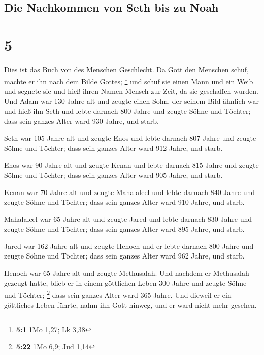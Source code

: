\hypertarget{die-nachkommen-von-seth-bis-zu-noah}{%
\subsection{Die Nachkommen von Seth bis zu
Noah}\label{die-nachkommen-von-seth-bis-zu-noah}}

\hypertarget{section-4}{%
\section{5}\label{section-4}}

 Dies ist das Buch von des Menschen Geschlecht. Da Gott
den Menschen schuf, machte er ihn nach dem Bilde Gottes; \footnote{\textbf{5:1}
  1Mo 1,27; Lk 3,38}  und schuf sie einen Mann und ein
Weib und segnete sie und hieß ihren Namen Mensch zur Zeit, da sie
geschaffen wurden.  Und Adam war 130 Jahre alt und zeugte
einen Sohn, der seinem Bild ähnlich war und hieß ihn Seth 
und lebte darnach 800 Jahre und zeugte Söhne und Töchter; 
dass sein ganzes Alter ward 930 Jahre, und starb.

 Seth war 105 Jahre alt und zeugte Enos  und
lebte darnach 807 Jahre und zeugte Söhne und Töchter; 
dass sein ganzes Alter ward 912 Jahre, und starb.

 Enos war 90 Jahre alt und zeugte Kenan 
und lebte darnach 815 Jahre und zeugte Söhne und Töchter;
 dass sein ganzes Alter ward 905 Jahre, und starb.

 Kenan war 70 Jahre alt und zeugte Mahalaleel
 und lebte darnach 840 Jahre und zeugte Söhne und
Töchter;  dass sein ganzes Alter ward 910 Jahre, und
starb.

 Mahalaleel war 65 Jahre alt und zeugte Jared
 und lebte darnach 830 Jahre und zeugte Söhne und
Töchter;  dass sein ganzes Alter ward 895 Jahre, und
starb.

 Jared war 162 Jahre alt und zeugte Henoch
 und er lebte darnach 800 Jahre und zeugte Söhne und
Töchter;  dass sein ganzes Alter ward 962 Jahre, und
starb.

 Henoch war 65 Jahre alt und zeugte Methusalah.
 Und nachdem er Methusalah gezeugt hatte, blieb er in
einem göttlichen Leben 300 Jahre und zeugte Söhne und Töchter;
\footnote{\textbf{5:22} 1Mo 6,9; Jud 1,14}  dass sein
ganzes Alter ward 365 Jahre.  Und dieweil er ein
göttliches Leben führte, nahm ihn Gott hinweg, und er ward nicht mehr
gesehen.

